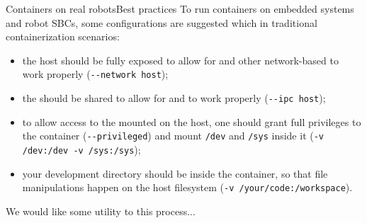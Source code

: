 \begin{frame}{Containers on real robots}{Best practices}
  To run containers on embedded systems and robot SBCs, some configurations are suggested which  in traditional containerization scenarios:
  \begin{itemize}
    \item the host  should be fully exposed to allow for  and other network-based  to work properly (\texttt{-{}-network host});
    \item the  should be shared to allow for  and  to work properly (\texttt{-{}-ipc host});
    \item to allow access to the  mounted on the host, one should grant full privileges to the container (\texttt{-{}-privileged}) and mount \texttt{/dev} and \texttt{/sys} inside it (\texttt{-v /dev:/dev -v /sys:/sys});
    \item your development directory should be  inside the container, so that file manipulations happen on the host filesystem (\texttt{-v /your/code:/workspace}).
  \end{itemize}
  We would like some utility to  this process...
\end{frame}
